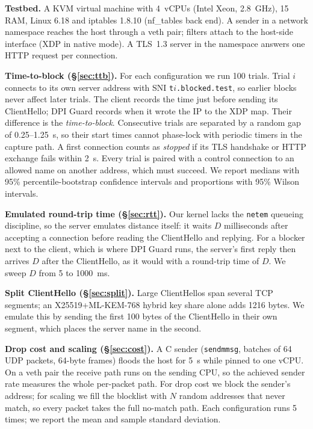 \documentclass[sigconf,nonacm]{acmart}
\newcommand{\sys}{DPI Guard}
\begin{document}
\textbf{Testbed.} A KVM virtual machine with 4~vCPUs (Intel Xeon, \SI{2.8}{\giga\hertz}),
\SI{15}{\giga\byte} RAM, Linux 6.18 and iptables 1.8.10 (nf\_tables back end). A sender in a
network namespace reaches the host through a veth pair; filters attach to the host-side
interface (XDP in native mode). A TLS~1.3 server in the namespace answers one HTTP request per
connection.

\textbf{Time-to-block (\S\ref{sec:ttb}).} For each configuration we run 100 trials. Trial $i$
connects to its own server address with SNI \texttt{t$i$.blocked.test}, so earlier blocks never
affect later trials. The client records the time just before sending its ClientHello; \sys{}
records when it wrote the IP to the XDP map. Their difference is the \emph{time-to-block}.
Consecutive trials are separated by a random gap of 0.25--\SI{1.25}{\second}, so their start
times cannot phase-lock with periodic timers in the capture path. A first connection counts as
\emph{stopped} if its TLS handshake or HTTP exchange fails within
\SI{2}{\second}. Every trial is paired with a control connection to an allowed name on another
address, which must succeed. We report medians with 95\% percentile-bootstrap confidence
intervals and proportions with 95\% Wilson intervals.

\textbf{Emulated round-trip time (\S\ref{sec:rtt}).} Our kernel lacks the \texttt{netem} queueing
discipline, so the server emulates distance itself: it waits $D$ milliseconds after accepting a
connection before reading the ClientHello and replying. For a blocker next to the client, which
is where \sys{} runs, the server's first reply then arrives $D$ after the ClientHello, as it
would with a round-trip time of $D$. We sweep $D$ from 5 to \SI{1000}{\milli\second}.

\textbf{Split ClientHello (\S\ref{sec:split}).} Large ClientHellos span several TCP segments;
an X25519+ML-KEM-768 hybrid key share alone adds \num{1216} bytes. We emulate this by sending the first 100
bytes of the ClientHello in their own segment, which places the server name in the second.

\textbf{Drop cost and scaling (\S\ref{sec:cost}).} A C sender (\texttt{sendmmsg}, batches of 64
UDP packets, 64-byte frames) floods the host for \SI{5}{\second} while pinned to one vCPU. On a
veth pair the receive path runs on the sending CPU, so the achieved sender rate measures the
whole per-packet path. For drop cost we block the sender's address; for scaling we fill the
blocklist with $N$ random addresses that never match, so every packet takes the full
no-match path. Each configuration runs 5 times; we report the mean and sample standard
deviation.
\end{document}
